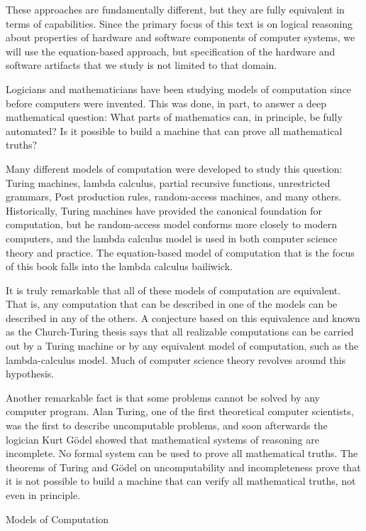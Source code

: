 These approaches are fundamentally different, but they
are fully equivalent in terms of capabilities.
Since the primary focus of this text is on logical reasoning
about properties of hardware and software components of computer systems,
we will use the equation-based approach,
but specification of the hardware and software artifacts that we study
is not limited to that domain.

\begin{aside}
Logicians and mathematicians have been studying models of computation
since before computers were invented. This was done, in part, to
answer a deep mathematical question: What parts of mathematics can,
in principle, be fully automated?  Is it possible to
build a machine that can prove all mathematical truths?

Many different models of computation were developed to study this question:
Turing machines, lambda calculus,
partial recursive functions,
unrestricted grammars, Post production rules, random-access machines,
and many others.
Historically, Turing machines have provided the canonical foundation for computation,
but he random-access model conforms more closely to modern computers,
and the lambda calculus model is used in both computer science theory and practice.
The equation-based model of computation that is the focus of this book
falls into the lambda calculus bailiwick.

It is truly remarkable that all of these models of
computation are equivalent.  That is,
any computation that can be described in one of the models can
be described in any of the others.
A conjecture based on this equivalence
and known as the Church-Turing thesis
says that all realizable computations can
be carried out by a Turing machine or by
any equivalent model of computation, such as
the lambda-calculus model.
Much of computer science theory
revolves around this hypothesis.

Another remarkable fact is that some problems cannot be solved
by any computer program.
Alan Turing, one of the first theoretical computer scientists,
was the first to describe uncomputable problems,
and soon afterwards the logician Kurt G\"odel
showed that mathematical systems of reasoning
are incomplete. No formal system can be used
to prove all mathematical truths.
The theorems of Turing and G\"odel on uncomputability and incompleteness
prove that it is not possible to build a machine that can verify all mathematical
truths, not even in principle.

\caption{Models of Computation}
\label{aside-model-of-computation}
\end{aside}

